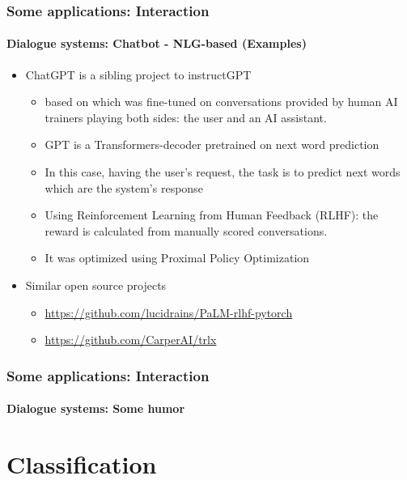 \documentclass[xcolor=table]{beamer}
\begin{document}
\begin{frame}
	\frametitle{Some applications: Interaction}
	\framesubtitle{Dialogue systems: Chatbot - NLG-based (Examples)}
	
	\begin{itemize}
		\item ChatGPT is a sibling project to instructGPT \cite{2022-ouyang-al}
		\begin{itemize}
			\item based on  which was fine-tuned on conversations provided by human AI trainers playing both sides: the user and an AI assistant. 
			\item GPT is a Transformers-decoder pretrained on next word prediction
			\item In this case, having the user's request, the task is to predict next words which are the system's response
			\item Using Reinforcement Learning from Human Feedback (RLHF): the reward is calculated from manually scored conversations.
			\item It was optimized using Proximal Policy Optimization \cite{2017-schulman-al}
		\end{itemize}
	\item Similar open source projects
	\begin{itemize}
		\item \url{https://github.com/lucidrains/PaLM-rlhf-pytorch}
		\item \url{https://github.com/CarperAI/trlx}
	\end{itemize}
	\end{itemize}
	
\end{frame}


\begin{frame}
	\frametitle{Some applications: Interaction}
	\framesubtitle{Dialogue systems: Some humor}
	
	\begin{center}
	\end{center}
\end{frame}


\section{Classification}
\end{document}
